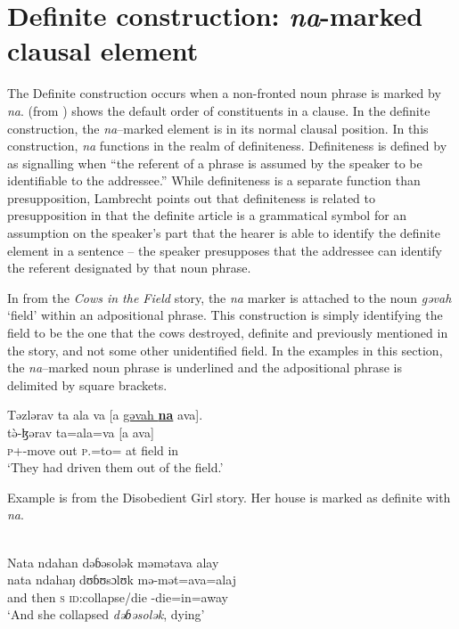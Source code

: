 \section{Definite construction: \textit{na}-marked clausal element}\label{sec:11.4}
\hypertarget{RefHeading1213281525720847}{}
The Definite construction occurs when a non-fronted noun phrase is marked by \textit{na}.  (from ) shows the default order of constituents in a clause. In the definite construction, the \textit{na}–marked element is in its normal clausal position. In this construction, \textit{na}  functions in the realm of definiteness. Definiteness is defined by \citet[79]{Lambrecht1994} as signalling when “the referent of a phrase is assumed by the speaker to be identifiable to the addressee.” While definiteness is a separate function than presupposition, Lambrecht points out that definiteness is related to presupposition in that the definite article is a grammatical symbol for an assumption on the speaker’s part that the hearer is able to identify the definite element in a sentence -- the speaker presupposes that the addressee can identify the referent designated by that noun phrase.  

In  from the \textit{Cows in the Field} story, the \textit{na} marker is attached to the noun \textit{gəvah} ‘field’ within an adpositional phrase. This construction is simply identifying the field to be the one that the cows destroyed, definite and previously mentioned in the story, and not some other unidentified field. In the examples in this section, the \textit{na}–marked noun phrase is underlined and the adpositional phrase is delimited by square brackets.

\ea \label{ex:11:41}
Təzlərav  ta  ala  va  [a  \underline{gəvah  \textbf{na}}  ava].\\
\gll  t\`ə-ɮərav     ta=ala=va    [a      ava]\\
      {\textsc{p}+{\PFV}-move out}   \textsc{p}.{\DO}=to={\PRF}   at  field   {\PSP}  in\\
\glt  ‘They had driven them out of the field.’
\z

Example  is  from the Disobedient Girl story. Her house is marked as definite with \textit{na}. 

\ea \label{ex:11:42}
\\
Nata  ndahan  dəɓəsolək  məmətava  alay\\  
\gll  nata    ndahaŋ  dʊɓʊsɔlʊk  mə-mət=ava=alaj \\   
      {and then}  \textsc{s} \textsc{id}:collapse/die  {\NOM}{}-die=in=away \\
\glt ‘And she collapsed \textit{dəɓəsolək}, dying’\\      
      
